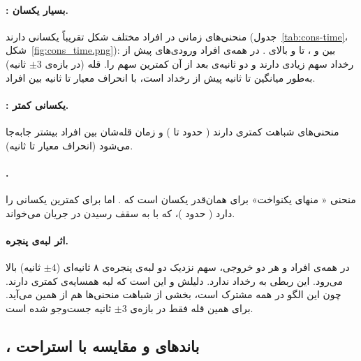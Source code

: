 
\paragraph{: بسیار یکسان.} منحنی‌های زمانی  در افراد مختلف شکل تقریباً یکسانی دارند (جدول~\ref{tab:cons-time}، شکل~\ref{fig:cons_time.png}):  بین  و ،  تا  و  بالای . در همه‌ی افراد ورودی‌های پیش از رخداد سهم زیادی دارند و دو ثانیه‌ی بعد از آن کمترین سهم را. قله (در بازه‌ی $\pm 3$ ثانیه) به‌طور میانگین  تا  ثانیه پیش از رخداد است، با انحراف معیار  تا  ثانیه بین افراد.

\paragraph{: یکسانی کمتر.} منحنی‌های  شباهت کمتری دارند ( حدود  تا ) و زمان قله‌شان بین افراد بیشتر جابه‌جا می‌شود (انحراف معیار  تا  ثانیه).

\paragraph{.} منحنی « منهای یکنواخت» برای  همان‌قدر یکسان است که . اما برای  کمترین یکسانی را دارد ( حدود )، که با به سقف رسیدن  در جریان  می‌خواند.

\paragraph{اثر لبه‌ی پنجره.} در همه‌ی افراد و هر دو خروجی، سهم  نزدیک دو لبه‌ی پنجره‌ی ۸ ثانیه‌ای ($\pm 4$ ثانیه) بالا می‌رود. این ربطی به رخداد ندارد. دلیلش  و این است که  لبه همسایه‌ی کمتری دارند. چون این الگو در همه مشترک است، بخشی از شباهت منحنی‌ها هم از همین می‌آید. برای همین قله فقط در بازه‌ی $\pm 3$ ثانیه جست‌وجو شده است.

\subsection{، باندهای  و مقایسه با استراحت}




